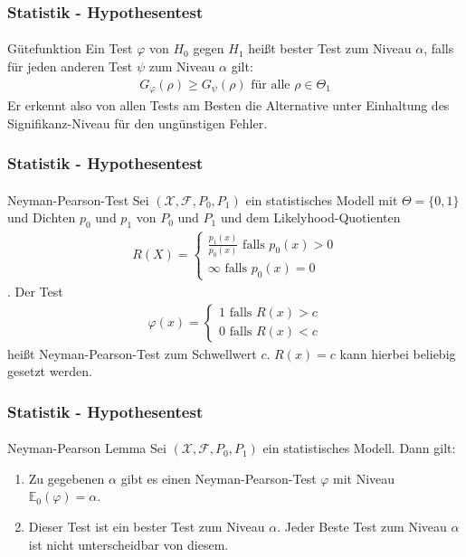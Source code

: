 \documentclass{beamer}
\begin{document}
\begin{frame}
    \frametitle{Statistik - Hypothesentest}
\framesubtitle{}
\begin{block}{Gütefunktion}
Ein Test $\varphi$ von $H_0$ gegen $H_1$ heißt bester Test zum Niveau $\alpha$, falls für jeden anderen Test $\psi$ zum 
 Niveau $\alpha$ gilt:
\begin{align*}
G_{\varphi}(\rho) \geq G_{\psi}(\rho) \text{ für alle } \rho \in \Theta_1
\end{align*}
Er erkennt also von allen Tests am Besten die Alternative unter Einhaltung  des Signifikanz-Niveau für den ungünstigen Fehler.
\end{block}

 \end{frame}



\begin{frame}
    \frametitle{Statistik - Hypothesentest}
\framesubtitle{}
\begin{block}{Neyman-Pearson-Test}
Sei   $(\mathcal{X}, \mathcal{F}, P_0, P_1)$ ein statistisches Modell mit $\Theta = \{ 0,1\}$ und Dichten $p_0$ und $p_1$ von $P_0$ und $P_1$ und dem Likelyhood-Quotienten
 \begin{align*}
 R(X) = \begin{cases} \frac{p_1(x)}{p_0(x)} \text{ falls } p_0(x) > 0 \\ \infty  \text{ falls } p_0(x) = 0 \end{cases}
\end{align*}. 
Der Test 
\begin{align*}
 \varphi(x) = \begin{cases} 1 \text{ falls } R(x) > c \\ 0  \text{ falls } R(x) < c \end{cases}
\end{align*}
heißt Neyman-Pearson-Test zum Schwellwert $c$. $R(x) = c$ kann hierbei beliebig gesetzt werden.
\end{block}

 \end{frame}


\begin{frame}
    \frametitle{Statistik - Hypothesentest}
\framesubtitle{}
\begin{block}{Neyman-Pearson Lemma}
Sei   $(\mathcal{X}, \mathcal{F}, P_0, P_1)$ ein statistisches Modell. Dann gilt:
\begin{enumerate}
\item Zu gegebenen $\alpha$ gibt es einen Neyman-Pearson-Test  $\varphi$ mit Niveau $\mathbb{E}_0(\varphi) = \alpha$.
\item Dieser Test ist ein bester Test zum Niveau $\alpha$. Jeder Beste Test   zum Niveau $\alpha$ ist nicht unterscheidbar von diesem.
\end{enumerate}
\end{block}

 \end{frame}
\end{document}
